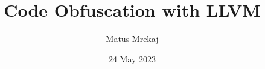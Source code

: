 \documentclass[fontsize=11pt,twocolumn]{article}
\title{\textbf{Code Obfuscation with LLVM}}
\author{Matus Mrekaj}
\date{24 May 2023}
\begin{document}
\maketitle

\textbf{}






\begin{spacing}{1}
    \printbibliography
\end{spacing}
\end{document}
